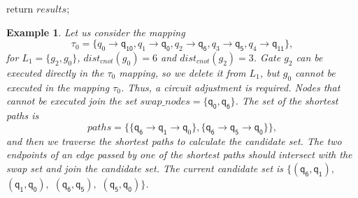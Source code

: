 \documentclass[journal]{IEEEtran}
\newtheorem{example}{Example}
\begin{document}
\begin{algorithm} [htbp]
		return $results$;
		
		\label{algorithm_neighborhood}
	\end{algorithm}
	
	\begin{example}
		Let us consider the mapping $$\tau_{0}=\{\textit{q}_\textit{0}\rightarrow  \textsf{q}_{\textsf{10}},\textit{q}_\textit{1}\rightarrow \textsf{q}_{\textsf{0}},
		\textit{q}_\textit{2}\rightarrow  \textsf{q}_{\textsf{6}},\textit{q}_\textit{3}\rightarrow  \textsf{q}_{\textsf{5}},\textit{q}_\textit{4}\rightarrow  \textsf{q}_{\textsf{11}}\} , $$ 
		for $L_{1}=\{g_{2},g_{0}\}$, $dist_{cnot}(g_{0})=6$ and $dist_{cnot}(g_{2})=3$. 
		Gate $g_{2}$ can be executed directly in the $\tau_{0}$ mapping, so we delete it from $L_{1}$,
		but $g_{0}$ cannot be executed in the mapping $\tau_{0}$.
		Thus, a circuit adjustment is required. 
		Nodes that cannot be executed join the set $swap\_nodes=\{\textsf{q}_{\textsf{0}},\textsf{q}_\textsf{6}\}$.
		The set of the shortest paths is $$paths=\{\{\textsf{q}_{\textsf{6}}\rightarrow \textsf{q}_{\textsf{1}} \rightarrow \textsf{q}_{0} \},\{\textsf{q}_\textsf{6}\rightarrow \textsf{q}_\textsf{5} \rightarrow \textsf{q}_\textsf{0} \}\},$$ 
		and then we traverse the shortest paths to calculate the  candidate set.
		The two endpoints of an edge passed by one of the shortest paths should intersect with the swap set and join the candidate set.
		The current candidate set is $\{(\textsf{q}_\textsf{6},\textsf{q}_\textsf{1}),$ $(\textsf{q}_\textsf{1},\textsf{q}_\textsf{0}),$ $(\textsf{q}_\textsf{6},\textsf{q}_\textsf{5}),$ $(\textsf{q}_\textsf{5},\textsf{q}_\textsf{0}) \}$.
	\end{example}
	
\end{document}
